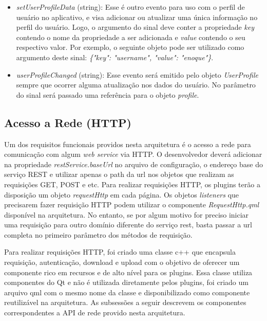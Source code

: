 \begin{itemize}
\begin{itemize}
		\item \textit{setUserProfileData} (string): Esse é outro evento para uso com o perfil de usuário no aplicativo, e visa adicionar ou atualizar uma única informação no perfil do usuário. Logo, o argumento do sinal deve conter a propriedade \textit{key} contendo o nome da propriedade a ser adicionada e \textit{value} contendo o seu respectivo valor. Por exemplo, o seguinte objeto pode ser utilizado como argumento deste sinal: \textit{\{"key": "username", "value": "enoque"\}}.

		\item \textit{userProfileChanged} (string): Esse evento será emitido pelo objeto \textit{UserProfile} sempre que ocorrer alguma atualização nos dados do usuário. No parâmetro do sinal será passado uma referência para o objeto \textit{profile}.
	\end{itemize}
\end{itemize}


\subsection{Acesso a Rede (HTTP)}\label{sec:solucao-desenvolvida}
Um dos requisitos funcionais providos nesta arquitetura é o acesso a rede para comunicação com algum \textit{web service} via HTTP. O desenvolvedor deverá adicionar na propriedade \textit{restService.baseUrl} no arquivo de configuração, o endereço base do serviço REST e utilizar apenas o path da url nos objetos que realizam as requisições GET, POST e etc. Para realizar requisições HTTP, os plugins terão a disposição um objeto \textit{requestHttp} em cada página. Os objetos \textit{listeners} que precisarem fazer requisição HTTP podem utilizar o componente \textit{RequestHttp.qml} disponível na arquitetura. No entanto, se por algum motivo for preciso iniciar uma requisição para outro domínio diferente do serviço rest, basta passar a url completa no primeiro parâmetro dos métodos de requisição.\par

Para realizar requisições HTTP, foi criado uma classe c++ que encapsula requisição, autenticação, download e upload com o objetivo de oferecer um componente rico em recursos e de alto nível para os plugins. Essa classe utiliza componentes do Qt e não é utilizada diretamente pelos plugins, foi criado um arquivo qml com o mesmo nome da classe e disponibilizado como componente reutilizável na arquitetura. As subsessões a seguir descrevem os componentes correspondentes a API de rede provido nesta arquitetura.


